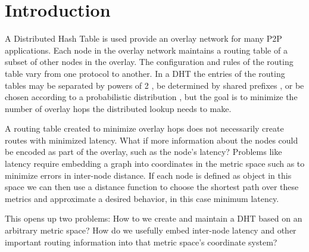 \documentclass{IEEEtran}
\begin{document}
\section{Introduction}
A Distributed Hash Table is used provide an overlay network for many P2P applications. %
Each node in the overlay network maintains a routing table of a subset of other nodes in the overlay.  
The configuration and rules of the routing table vary from one protocol to another.
In a DHT the entries of the routing tables may be separated by powers of 2 \cite{chord}, be determined by shared prefixes \cite{pastry}, or be chosen according to a probabilistic distribution \cite{kleinberg2000navigation}, but the goal is to minimize the number of overlay hops the distributed lookup needs to make. 


A routing table created to minimize overlay hops does not necessarily create routes with minimized latency.
What if more information about the nodes could be encoded as part of the overlay, such as the node's latency?
Problems like latency require embedding a graph into coordinates in the metric space such as to minimize errors in inter-node distance.
If each node is defined as object in this space we can then use a distance function to choose the shortest path over these metrics and approximate a desired behavior, in this case minimum latency.


This opens up two problems:
How to we create and maintain a DHT based on an arbitrary metric space?
How do we usefully embed inter-node latency and other important routing information into that metric space's coordinate system?
\end{document}
